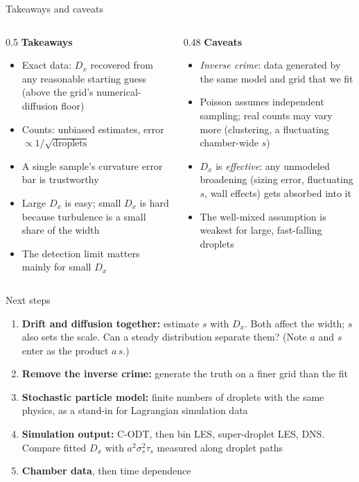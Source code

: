 \documentclass[aspectratio=169,10pt]{beamer}
\begin{document}
\begin{frame}{Takeaways and caveats}
\begin{columns}[T]
\begin{column}{0.5\textwidth}
\textbf{Takeaways}
\begin{itemize}
\item Exact data: $D_x$ recovered from any reasonable starting guess (above the grid's numerical-diffusion floor)
\item Counts: unbiased estimates, error $\propto1/\sqrt{\text{droplets}}$
\item A single sample's curvature error bar is trustworthy
\item Large $D_x$ is easy; small $D_x$ is hard because turbulence is a small share of the width
\item The detection limit matters mainly for small $D_x$
\end{itemize}
\end{column}
\begin{column}{0.48\textwidth}
\textbf{Caveats}
\begin{itemize}
\item \emph{Inverse crime}: data generated by the same model and grid that we fit
\item Poisson assumes independent sampling; real counts may vary more (clustering, a fluctuating chamber-wide $s$)
\item $D_x$ is \emph{effective}: any unmodeled broadening (sizing error, fluctuating $s$, wall effects) gets absorbed into it
\item The well-mixed assumption is weakest for large, fast-falling droplets
\end{itemize}
\end{column}
\end{columns}
\end{frame}

\begin{frame}{Next steps}
\begin{enumerate}
\item \textbf{Drift and diffusion together:} estimate $s$ with $D_x$. Both affect the width; $s$ also sets the scale. Can a steady distribution separate them? (Note $a$ and $s$ enter as the product $a\,s$.)
\item \textbf{Remove the inverse crime:} generate the truth on a finer grid than the fit
\item \textbf{Stochastic particle model:} finite numbers of droplets with the same physics, as a stand-in for Lagrangian simulation data
\item \textbf{Simulation output:} C-ODT, then bin LES, super-droplet LES, DNS. Compare fitted $D_x$ with $a^2\sigma_s^2\tau_s$ measured along droplet paths
\item \textbf{Chamber data}, then time dependence
\end{enumerate}
\end{frame}
\end{document}
